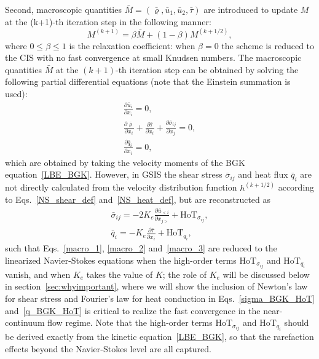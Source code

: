 Second, macroscopic quantities $\bar{M}=(\bar{\varrho},\bar{u}_1,\bar{u}_2, \bar{\tau})$ are introduced to update $M$ at the (k+1)-th iteration step in the following manner:
\begin{equation}\label{GSIS_K30}
M^{(k+1)}=\beta\bar{M}+(1-\beta)M^{(k+1/2)},
\end{equation} 
where $0\le\beta\le1$ is the relaxation coefficient: when $\beta=0$ the scheme is reduced to the CIS with no fast convergence at small Knudsen numbers. The macroscopic quantities $\bar{M}$ at the $(k+1)$-th iteration step can be obtained by solving the following partial differential equations (note that the Einstein summation is used):
\begin{eqnarray}
\frac{\partial {\bar{u}_i}}{\partial{x_i}}=0, \label{macro_1} \\
\frac{\partial {\bar{\varrho}}}{\partial{x_i}}+\frac{\partial {\bar{\tau}}}{\partial{x_i}}+\frac{\partial {\bar{\sigma}_{ij}}}{\partial{x_j}}=0, \label{macro_2} \\
\frac{\partial {\bar{q}_i}}{\partial{x_i}}=0, \label{macro_3}
\end{eqnarray}
which are obtained by taking the velocity moments of the BGK equation~\eqref{LBE_BGK}. However, in GSIS the shear stress $\bar{\sigma}_{ij}$ and heat flux $\bar{q}_i$ are not directly calculated from the velocity distribution function $h^{(k+1/2)}$ according to Eqs.~\eqref{NS_shear_def} and~\eqref{NS_heat_def}, but are reconstructed as
\begin{eqnarray}
\bar{\sigma}_{ij} =-2K_e\frac{\partial \bar{u}_{<i}}{\partial {x_{j>}}}+\text{HoT}_{\sigma_{ij}}, \label{sigma_BGK_HoT}\\
\bar{q}_i =-K_e\frac{\partial \bar{\tau}}{\partial x_i}+\text{HoT}_{q_i}, \label{q_BGK_HoT}
\end{eqnarray} 
such that Eqs.~\eqref{macro_1}, \eqref{macro_2} and~\eqref{macro_3} are reduced to the linearized Navier-Stokes equations when the high-order terms $\text{HoT}_{\sigma_{ij}}$ and $\text{HoT}_{q_i}$ vanish, and when $K_e$ takes the value of $K$; the role of $K_e$ will be discussed below in section~\ref{sec:whyimportant}, where we will show the inclusion of Newton's law for shear stress and Fourier's law for heat conduction in Eqs.~\eqref{sigma_BGK_HoT} and~\eqref{q_BGK_HoT} is critical to realize the fast convergence in the near-continuum flow regime. Note that the high-order terms $\text{HoT}_{\sigma_{ij}}$ and $\text{HoT}_{q_i}$ should be derived exactly from the kinetic equation~\eqref{LBE_BGK}, so that the rarefaction effects beyond the Navier-Stokes level are all captured. 


